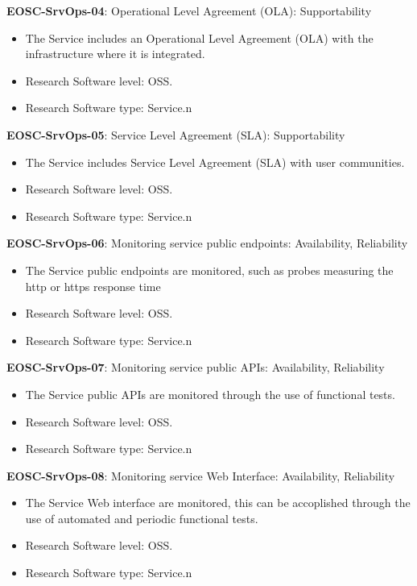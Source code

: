 \textbf{EOSC-SrvOps-04}: Operational Level Agreement (OLA): Supportability

\begin{itemize}
    \item The Service includes an Operational Level Agreement (OLA) with the infrastructure where it is integrated. \cite{orviz_fernandez_eosc-synergy_2020}
    \item Research Software level: OSS.
    \item Research Software type: Service.n\end{itemize}

\textbf{EOSC-SrvOps-05}: Service Level Agreement (SLA): Supportability

\begin{itemize}
    \item The Service includes Service Level Agreement (SLA) with user communities. \cite{orviz_fernandez_eosc-synergy_2020}
    \item Research Software level: OSS.
    \item Research Software type: Service.n\end{itemize}

\textbf{EOSC-SrvOps-06}: Monitoring service public endpoints: Availability, Reliability

\begin{itemize}
    \item The Service public endpoints are monitored, such as probes measuring the http or https response time \cite{orviz_fernandez_eosc-synergy_2020}
    \item Research Software level: OSS.
    \item Research Software type: Service.n\end{itemize}

\textbf{EOSC-SrvOps-07}: Monitoring service public APIs: Availability, Reliability

\begin{itemize}
    \item The Service public APIs are monitored through the use of functional tests. \cite{orviz_fernandez_eosc-synergy_2020}
    \item Research Software level: OSS.
    \item Research Software type: Service.n\end{itemize}

\textbf{EOSC-SrvOps-08}: Monitoring service Web Interface: Availability, Reliability

\begin{itemize}
    \item The Service Web interface are monitored, this can be accoplished through the use of automated and periodic functional tests. \cite{orviz_fernandez_eosc-synergy_2020}
    \item Research Software level: OSS.
    \item Research Software type: Service.n\end{itemize}

